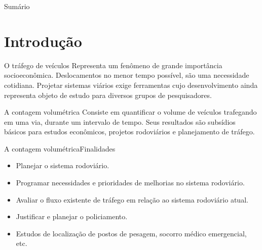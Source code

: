 \begin{frame}
  \titlepage
\end{frame}

\begin{frame}{Sumário}
  \tableofcontents
\end{frame}





\section{Introdução} %
\label{sec:introdu_o}

\begin{frame}{O tráfego de veículos}
  Representa um fenômeno de grande importância socioeconômica. Deslocamentos no menor tempo possível, são uma necessidade cotidiana. Projetar sistemas viários exige ferramentas cujo desenvolvimento ainda representa objeto de estudo para diversos grupos de pesquisadores.
\end{frame}

\begin{frame}{A contagem volumétrica}
  Consiste em quantificar o volume de veículos trafegando em uma via, durante um intervalo de tempo. Seus resultados são subsídios básicos para estudos econômicos, projetos rodoviários e planejamento de tráfego.
  
\end{frame}

\begin{frame}{A contagem volumétrica}{Finalidades}
  \begin{itemize}
    \item Planejar o sistema rodoviário.
    \item Programar necessidades e prioridades de melhorias no sistema rodoviário.
    \item Avaliar o fluxo existente de tráfego em relação ao sistema rodoviário atual.
    \item Justificar e planejar o policiamento.
    \item Estudos de localização de postos de pesagem, socorro médico emergencial, etc.
  \end{itemize}
\end{frame}

